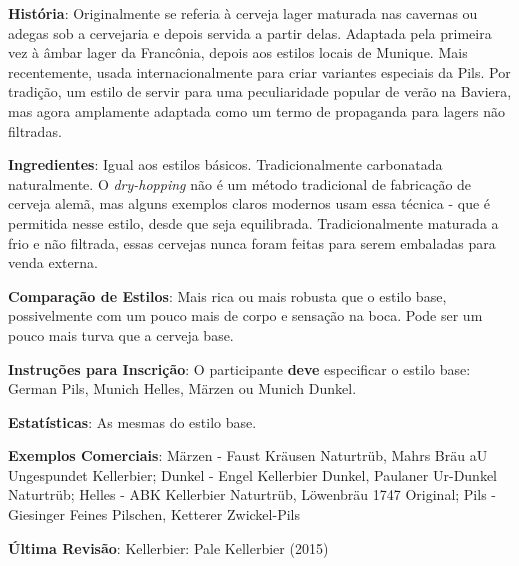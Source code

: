 \textbf{História}: Originalmente se referia à cerveja lager maturada nas cavernas ou adegas sob a cervejaria e depois servida a partir delas. Adaptada pela primeira vez à âmbar lager da Francônia, depois aos estilos locais de Munique. Mais recentemente, usada internacionalmente para criar variantes especiais da Pils. Por tradição, um estilo de servir para uma peculiaridade popular de verão na Baviera, mas agora amplamente adaptada como um termo de propaganda para lagers não filtradas.

\textbf{Ingredientes}: Igual aos estilos básicos. Tradicionalmente carbonatada naturalmente. O \textit{dry-hopping} não é um método tradicional de fabricação de cerveja alemã, mas alguns exemplos claros modernos usam essa técnica - que é permitida nesse estilo, desde que seja equilibrada. Tradicionalmente maturada a frio e não filtrada, essas cervejas nunca foram feitas para serem embaladas para venda externa.

\textbf{Comparação de Estilos}: Mais rica ou mais robusta que o estilo base, possivelmente com um pouco mais de corpo e sensação na boca. Pode ser um pouco mais turva que a cerveja base.

\textbf{Instruções para Inscrição}: O participante \textbf{deve} especificar o estilo base: German Pils, Munich Helles, Märzen ou Munich Dunkel.

\textbf{Estatísticas}: As mesmas do estilo base.

\textbf{Exemplos Comerciais}: Märzen - Faust Kräusen Naturtrüb, Mahrs Bräu aU Ungespundet Kellerbier; Dunkel - Engel Kellerbier Dunkel, Paulaner Ur-Dunkel Naturtrüb; Helles - ABK Kellerbier Naturtrüb, Löwenbräu 1747 Original; Pils - Giesinger Feines Pilschen, Ketterer Zwickel-Pils

\textbf{Última Revisão}: Kellerbier: Pale Kellerbier (2015)

